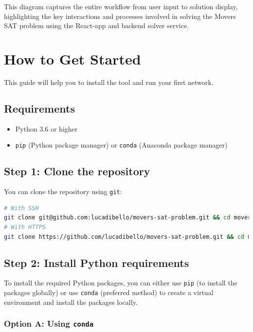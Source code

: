 \documentclass[a4paper, 11pt]{article}
\begin{document}
This diagram captures the entire workflow from user input to solution display, highlighting the key interactions and processes involved in solving the Movers SAT problem using the React-app and backend solver service.
\pagebreak

\section{How to Get Started}
This guide will help you to install the tool and run your first network.

\subsection{Requirements}

\begin{itemize}
	\item Python 3.6 or higher
	\item \texttt{pip} (Python package manager) or \texttt{conda} (Anaconda package manager)
\end{itemize}

\subsection{Step 1: Clone the repository}

You can clone the repository using \texttt{git}:

\begin{lstlisting}[language=bash]
# With SSH
git clone git@github.com:lucadibello/movers-sat-problem.git && cd movers-sat-problem
# With HTTPS
git clone https://github.com/lucadibello/movers-sat-problem.git && cd movers-sat-problem
\end{lstlisting}

\subsection{Step 2: Install Python requirements}

To install the required Python packages, you can either use \texttt{pip} (to install the packages globally) or use \texttt{conda} (preferred method) to create a virtual environment and install the packages locally.

\subsubsection*{Option A: Using \texttt{conda}}
\end{document}
